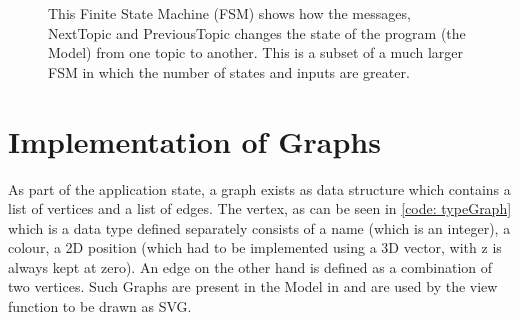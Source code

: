 \begin{figure}[h] %
\centering %
\caption{This Finite State Machine (FSM) 
        shows how the messages, NextTopic and PreviousTopic
        changes the state of the program (the Model) from
        one topic to another. This is a subset of a much larger
        FSM in which the number of states and inputs are greater.
        }
\label{fig:my_label}
\end{figure}
\section{Implementation of Graphs}
As part of the application state, a graph exists as data structure which contains a list of
vertices and a list of edges. The vertex, as can be seen in \autoref{code:
typeGraph} which is a data type defined separately consists of a name (which is
an integer), a colour, a 2D position (which had to be implemented using a 3D
vector, with z is always kept at zero).  An edge on the other hand is defined
as a combination of two vertices. Such Graphs are present in the Model in and
are used by the view function to be drawn as SVG.

